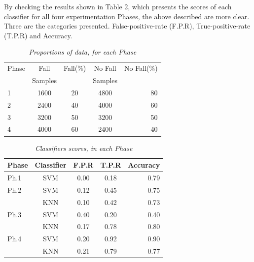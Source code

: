 \documentclass[10pt, conference, compsocconf]{IEEEtran}
\begin{document}
By checking the results shown in Table 2, which presents the scores of each classifier for all four experimentation Phases, the above described are more clear. Three are the categories presented. False-positive-rate (F.P.R), True-positive-rate (T.P.R) and Accuracy.  

\begin{table}[ht]
\caption{\it Proportions of data, for each Phase}
\label{Proportions}
\begin{center}
\begin{small}
\begin{sc}
\begin{tabular}{|l|c|c|c|r|}
\hline
Phase & Fall & Fall(\%) & No Fall & No Fall(\%) \\
      & Samples &        & Samples &            \\ 
\hline
1    & 1600 & 20 & 4800 & 80 \\
\hline
2    & 2400 & 40 & 4000 & 60 \\
\hline
3    & 3200 & 50 & 3200 & 50 \\
\hline
4    & 4000 & 60 & 2400 & 40 \\
\hline
\end{tabular}
\end{sc}
\end{small}
\end{center}
\vskip 0.1in
\end{table}

\begin{table}[t]
\caption{\it Classifiers scores, in each Phase}
\label{Scores}
\vskip 0.1in
\begin{center}
\begin{small}
\begin{sc}
\begin{tabular}{|l|c|c|c|r|}
\hline
Phase & Classifier & F.P.R & T.P.R & Accuracy\\
\hline
Ph.1    & SVM & 0.00 & 0.18 & 0.79 \\
\hline
Ph.2    & SVM & 0.12 & 0.45 & 0.75 \\
     & KNN & 0.10 & 0.42 & 0.73 \\
\hline
Ph.3    & SVM & 0.40 & 0.20 & 0.40 \\
	 & KNN & 0.17 & 0.78 & 0.80 \\
\hline
Ph.4    & SVM & 0.20 & 0.92 & 0.90 \\
	 & KNN & 0.21 & 0.79 & 0.77 \\
\hline
\end{tabular}
\end{sc}
\end{small}
\end{center}
\vskip -0.3in
\end{table}
\end{document}
